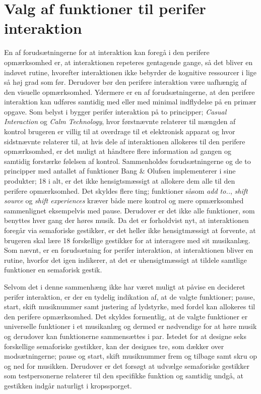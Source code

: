 \section{Valg af funktioner til perifer interaktion}
\label{DiskussionFunktionerCasualInteraction}
%
En af forudsætningerne for at interaktion kan foregå i den perifere opmærksomhed er, at interaktionen repeteres gentagende gange, så det bliver en indøvet rutine, hvorefter interaktionen ikke bebyrder de kognitive ressourcer i lige så høj grad som før. Derudover bør den perifere interaktion være uafhængig af den visuelle opmærksomhed. Ydermere er en af forudsætningerne, at den perifere interaktion kan udføres samtidig med eller med minimal indflydelse på en primær opgave. Som belyst i  bygger perifer interaktion på to principper; \textit{Casual Interaction} og \textit{Calm Technology}, hvor førstnævnte relaterer til mængden af kontrol brugeren er villig til at overdrage til et elektronisk apparat og hvor sidstnævnte relaterer til, at hvis dele af interaktionen allokeres til den perifere opmærksomhed, er det muligt at håndtere flere information ad gangen og samtidig forstærke følelsen af kontrol. Sammenholdes forudsætningerne og de to principper med antallet af funktioner Bang $\&$ Olufsen implementerer i sine produkter; 18 i alt, er det ikke hensigtsmæssigt at allokere dem alle til den perifere opmærksomhed. Det skyldes flere ting; funktioner såsom \textit{add to..}, \textit{shift source} og \textit{shift experiences} kræver både mere kontrol og mere opmærksomhed sammenlignet eksempelvis med pause. Derudover er det ikke alle funktioner, som benyttes hver gang der høres musik. Da det er forholdvist nyt, at interaktionen foregår via semaforiske gestikker, er det heller ikke hensigtmæssigt at forvente, at brugeren skal lære 18 forskellige gestikker for at interagere med sit musikanlæg. Som nævnt, er en forudsætning for perifer interaktion, at interaktionen bliver en rutine, hvorfor det igen indikerer, at det er uhensigtmæssigt at tildele samtlige funktioner en semaforisk gestik. 

Selvom det i denne sammenhæng ikke har været muligt at påvise en decideret perifer interaktion, er der en tydelig indikation af, at de valgte funktioner; pause, start, skift musiknummer samt justering af lydstyrke, med fordel kan allokeres til den perifere opmærksomhed. Det skyldes formentlig, at de valgte funktioner er universelle funktioner i et musikanlæg og dermed er nødvendige for at høre musik og derudover kan funktionerne sammensættes i par. Istedet for at designe seks forskellige semaforiske gestikker, kan der designes tre, som dækker over modsætningerne; pause og start, skift musiknummer frem og tilbage samt skru op og ned for musikken. Derudover er det forsøgt at udvælge semaforiske gestikker som testpersonerne relaterer til den specifikke funktion og samtidig undgå, at gestikken indgår naturligt i kropssporget.  

